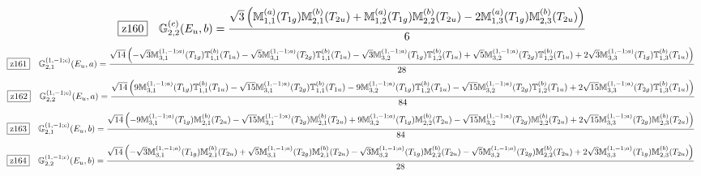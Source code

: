 \documentclass[fleqn,10pt,landscape]{jsarticle}
\begin{document}
\begin{dmath*}
\hspace*{3mm}\fbox{z160}\quad \mathbb{G}_{2,2}^{(c)}(E_{u},b)=\frac{\sqrt{3} \left(\mathbb{M}_{1,1}^{(a)}(T_{1g}) \mathbb{M}_{2,1}^{(b)}(T_{2u}) + \mathbb{M}_{1,2}^{(a)}(T_{1g}) \mathbb{M}_{2,2}^{(b)}(T_{2u}) - 2 \mathbb{M}_{1,3}^{(a)}(T_{1g}) \mathbb{M}_{2,3}^{(b)}(T_{2u})\right)}{6}
\end{dmath*}
\begin{dmath*}
\hspace*{3mm}\fbox{z161}\quad \mathbb{G}_{2,1}^{(1,-1;c)}(E_{u},a)=\frac{\sqrt{14} \left(- \sqrt{3} \mathbb{M}_{3,1}^{(1,-1;a)}(T_{1g}) \mathbb{T}_{1,1}^{(b)}(T_{1u}) - \sqrt{5} \mathbb{M}_{3,1}^{(1,-1;a)}(T_{2g}) \mathbb{T}_{1,1}^{(b)}(T_{1u}) - \sqrt{3} \mathbb{M}_{3,2}^{(1,-1;a)}(T_{1g}) \mathbb{T}_{1,2}^{(b)}(T_{1u}) + \sqrt{5} \mathbb{M}_{3,2}^{(1,-1;a)}(T_{2g}) \mathbb{T}_{1,2}^{(b)}(T_{1u}) + 2 \sqrt{3} \mathbb{M}_{3,3}^{(1,-1;a)}(T_{1g}) \mathbb{T}_{1,3}^{(b)}(T_{1u})\right)}{28}
\end{dmath*}
\begin{dmath*}
\hspace*{3mm}\fbox{z162}\quad \mathbb{G}_{2,2}^{(1,-1;c)}(E_{u},a)=\frac{\sqrt{14} \left(9 \mathbb{M}_{3,1}^{(1,-1;a)}(T_{1g}) \mathbb{T}_{1,1}^{(b)}(T_{1u}) - \sqrt{15} \mathbb{M}_{3,1}^{(1,-1;a)}(T_{2g}) \mathbb{T}_{1,1}^{(b)}(T_{1u}) - 9 \mathbb{M}_{3,2}^{(1,-1;a)}(T_{1g}) \mathbb{T}_{1,2}^{(b)}(T_{1u}) - \sqrt{15} \mathbb{M}_{3,2}^{(1,-1;a)}(T_{2g}) \mathbb{T}_{1,2}^{(b)}(T_{1u}) + 2 \sqrt{15} \mathbb{M}_{3,3}^{(1,-1;a)}(T_{2g}) \mathbb{T}_{1,3}^{(b)}(T_{1u})\right)}{84}
\end{dmath*}
\begin{dmath*}
\hspace*{3mm}\fbox{z163}\quad \mathbb{G}_{2,1}^{(1,-1;c)}(E_{u},b)=\frac{\sqrt{14} \left(- 9 \mathbb{M}_{3,1}^{(1,-1;a)}(T_{1g}) \mathbb{M}_{2,1}^{(b)}(T_{2u}) - \sqrt{15} \mathbb{M}_{3,1}^{(1,-1;a)}(T_{2g}) \mathbb{M}_{2,1}^{(b)}(T_{2u}) + 9 \mathbb{M}_{3,2}^{(1,-1;a)}(T_{1g}) \mathbb{M}_{2,2}^{(b)}(T_{2u}) - \sqrt{15} \mathbb{M}_{3,2}^{(1,-1;a)}(T_{2g}) \mathbb{M}_{2,2}^{(b)}(T_{2u}) + 2 \sqrt{15} \mathbb{M}_{3,3}^{(1,-1;a)}(T_{2g}) \mathbb{M}_{2,3}^{(b)}(T_{2u})\right)}{84}
\end{dmath*}
\begin{dmath*}
\hspace*{3mm}\fbox{z164}\quad \mathbb{G}_{2,2}^{(1,-1;c)}(E_{u},b)=\frac{\sqrt{14} \left(- \sqrt{3} \mathbb{M}_{3,1}^{(1,-1;a)}(T_{1g}) \mathbb{M}_{2,1}^{(b)}(T_{2u}) + \sqrt{5} \mathbb{M}_{3,1}^{(1,-1;a)}(T_{2g}) \mathbb{M}_{2,1}^{(b)}(T_{2u}) - \sqrt{3} \mathbb{M}_{3,2}^{(1,-1;a)}(T_{1g}) \mathbb{M}_{2,2}^{(b)}(T_{2u}) - \sqrt{5} \mathbb{M}_{3,2}^{(1,-1;a)}(T_{2g}) \mathbb{M}_{2,2}^{(b)}(T_{2u}) + 2 \sqrt{3} \mathbb{M}_{3,3}^{(1,-1;a)}(T_{1g}) \mathbb{M}_{2,3}^{(b)}(T_{2u})\right)}{28}
\end{dmath*}
\end{document}
